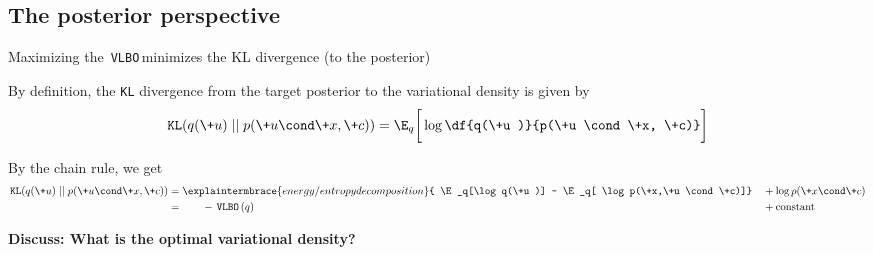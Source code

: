 \documentclass[10pt]{beamer}
\newcommand{\VLBO}{\,\texttt{VLBO}\,}
\begin{document}
\subsection{The posterior perspective}
\begin{frame}{Maximizing the \VLBO minimizes the KL divergence \tiny (to the posterior)}  


By definition, the \texttt{KL} divergence from the target posterior to the variational density is given by
\begin{equation*}
\texttt{KL} (q(\+u) \; || \; p(\+u \cond \+x, \+c)) =  \E_q \bigg[\log \df{q(\+u )}{p(\+u \cond \+x, \+c)} \bigg] 
\end{equation*}

 


By the chain rule, we get 
\begin{align*} 
 \texttt{KL} (q(\+u) \; || \; p(\+u \cond \+x, \+c)) & = \explaintermbrace{energy/entropy decomposition}{ \E_q[\log q(\+u )]  - \E_q[ \log p(\+x,\+u \cond \+c)]} &&+\log p(\+x \cond \+c) \\
 & = \hphantom{blah} -\VLBO(q)  && +  \text{constant} 
 \end{align*}
 

 
\vfill \tiny \bf{Discuss:} What is the optimal variational density?

\end{frame}
\end{document}

